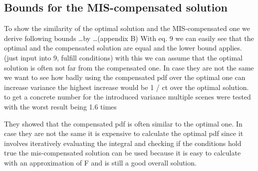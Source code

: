 \subsection{Bounds for the MIS-compensated solution}
To show the similarity of the optimal solution and the MIS-compensated one we derive following bounds \dots by \dots (appendix B)
With eq. 9 we can easily see that the optimal and the compensated solution are equal and the lower bound applies. (just input into 9, fulfill conditions)
with this we can assume that the optimal solution is often not far from the compensated one.
In case they are not the same we want to see how badly using the compensated pdf over the optimal one can increase variance
the highest increase would be 1 / ct over the optimal solution.
to get a concrete number for the introduced variance multiple scenes were tested with the worst result being 1.6 times

They showed that the compensated pdf is often similar to the optimal one.
In case they are not the same it is expensive to calculate the optimal pdf since it involves iteratively evaluating the integral and checking if the conditions hold true
the mis-compensated solution can be used because it is easy to calculate with an approximation of F and is still a good overall solution.



